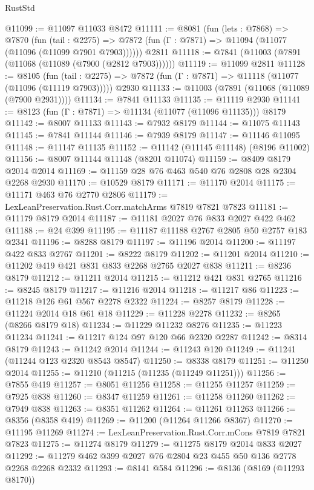 \begin{lexlean}{RustStd}
\begin{coremodule}
@11099 := @11097 @11033 @8472
@11111 := @8081
    (fun (lets : @7868) =>
    @7870
      (fun (tail : @2275) =>
      @7872 (fun (Γ : @7871) => @11094 (@11077 (@11096 (@11099 @7901 @7903))))))
    @2811
@11118 := @7841 (@11003 (@7891 (@11068 (@11089 (@7900 (@2812 @7903))))))
@11119 := @11099 @2811
@11128 := @8105
    (fun (tail : @2275) => @7872 (fun (Γ : @7871) => @11118 (@11077 (@11096 (@11119 @7903)))))
    @2930
@11133 := @11003 (@7891 (@11068 (@11089 (@7900 @2931))))
@11134 := @7841 @11133
@11135 := @11119 @2930
@11141 := @8123 (fun (Γ : @7871) => @11134 (@11077 (@11096 @11135))) @8179
@11142 := @8007 @11133
@11143 := @7932 @8179
@11144 := @11075 @11143
@11145 := @7841 @11144
@11146 := @7939 @8179
@11147 := @11146 @11095
@11148 := @11147 @11135
@11152 := @11142 (@11145 @11148) (@8196 @11002)
@11156 := @8007 @11144 @11148 (@8201 @11074)
@11159 := @8409 @8179 @2014 @2014
@11169 := @11159 @28 @76 @463 @540 @76 @2808 @28 @2304 @2268 @2930
@11170 := @10529 @8179
@11171 := @11170 @2014
@11175 := @11171 @463 @76 @2770 @2806
@11179 := LexLeanPreservation.Rust.Corr.matchArms @7819 @7821 @7823
@11181 := @11179 @8179 @2014
@11187 := @11181 @2027 @76 @833 @2027 @422 @462
@11188 := @24 @399
@11195 := @11187 @11188 @2767 @2805 @50 @2757 @183 @2341
@11196 := @8288 @8179
@11197 := @11196 @2014
@11200 := @11197 @422 @833 @2767
@11201 := @8222 @8179
@11202 := @11201 @2014
@11210 := @11202 @419 @421 @831 @833 @2268 @2765 @2027 @838
@11211 := @8236 @8179
@11212 := @11211 @2014
@11215 := @11212 @421 @831 @2765
@11216 := @8245 @8179
@11217 := @11216 @2014
@11218 := @11217 @86
@11223 := @11218 @126 @61 @567 @2278 @2322
@11224 := @8257 @8179
@11228 := @11224 @2014 @18 @61 @18
@11229 := @11228 @2278
@11232 := @8265 (@8266 @8179 @18)
@11234 := @11229 @11232 @8276
@11235 := @11223 @11234
@11241 := @11217 @124 @97 @120 @66 @2320 @2287
@11242 := @8314 @8179
@11243 := @11242 @2014
@11244 := @11243 @120
@11249 := @11241 (@11244 @123 @2320 @8543 @8547)
@11250 := @8338 @8179
@11251 := @11250 @2014
@11255 := @11210 (@11215 (@11235 (@11249 @11251)))
@11256 := @7855 @419
@11257 := @8051 @11256
@11258 := @11255 @11257
@11259 := @7925 @838
@11260 := @8347 @11259
@11261 := @11258 @11260
@11262 := @7949 @838
@11263 := @8351 @11262
@11264 := @11261 @11263
@11266 := @8356 (@8358 @419)
@11269 := @11200 (@11264 @11266 @8367)
@11270 := @11195 @11269
@11274 := LexLeanPreservation.Rust.Corr.mCons @7819 @7821 @7823
@11275 := @11274 @8179
@11279 := @11275 @8179 @2014 @833 @2027
@11292 := @11279 @462 @399 @2027 @76 @2804 @23 @455 @50 @136 @2778 @2268 @2268 @2332
@11293 := @8141 @584
@11296 := @8136 (@8169 (@11293 @8170))

\end{coremodule}
\end{lexlean}
